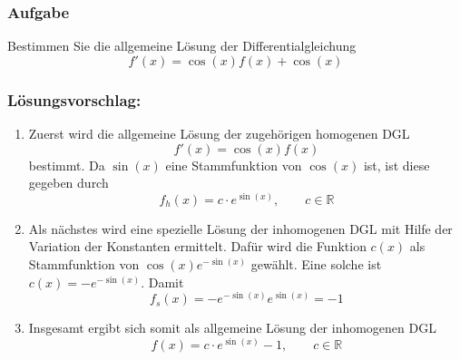 \documentclass[a4paper,11pt]{scrartcl}
\newcounter{auf}
\newcommand{\Aufgabe}%
        {\addtocounter{auf}{1} \subsubsection*{\rmfamily  Aufgabe \theauf \hspace{1em}} }
\newcommand{\RR}{\mathbb{R}}
\begin{document}
\newpage
\Aufgabe
Bestimmen Sie die allgemeine Lösung der Differentialgleichung
$$
f'(x)=\cos(x)f(x)+\cos(x)
$$


\subsubsection*{Lösungsvorschlag:}
\begin{enumerate}[1)]
\item Zuerst wird die allgemeine Lösung der zugehörigen homogenen DGL 
$$
f'(x)=\cos(x)f(x)
$$
bestimmt. Da $\sin(x)$ eine Stammfunktion von $\cos(x)$ ist, ist diese gegeben durch
$$
f_h(x)=c\cdot e^{\sin(x)} ,\qquad c \in \RR
$$
\item Als nächstes wird eine spezielle Lösung der inhomogenen DGL mit Hilfe der Variation der Konstanten ermittelt. Dafür wird die Funktion $c(x)$ als Stammfunktion von $\cos(x)e^{-\sin(x)}$ gewählt. Eine solche ist $c(x)=-e^{-\sin(x)}$. Damit
$$
f_s(x)=-e^{-\sin(x)}e^{\sin(x)}=-1
$$
\item Insgesamt ergibt sich somit als allgemeine Lösung der inhomogenen DGL
$$
f(x)=c\cdot e^{\sin(x)}-1 ,\qquad c \in \RR
$$
\end{enumerate}
\end{document}

